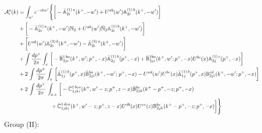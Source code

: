 \documentclass[aps,prd,amsmath,amssymb,nofootinbib]{revtex4-2}
\def\mf#1{\mathbb{#1}}
\numberwithin{equation}{section}
\begin{document}
\begin{align}
         {\cal A}^{a}_{i}(k) & = \int_{w^{\prime}}e^{-ikw^{\prime}} \Bigg\{\bigg[-\bar{\mf{A}}^{(1)\,a}_{2i}(k^{+},-w^{\prime})+U^{ab}(w^{\prime})\mf{A}^{(1)\, b}_{2i}(k^{+},
         - w^{\prime})\bigg]\notag \\ & +\bigg[-\bar{\mf{A}}^{(1)\,a}_{2i}(k^{+},-w^{\prime})\mf{N}_{2}+ U^{ab}(w^{\prime})\bar{\mf{N}}_{2}\mf{A}^{ (1)\, b}_{2i}(k^{+},-w^{\prime})\bigg]\notag 
         \\ & +\bigg[U^{ab}(w^{\prime})\mf{A}^{(3)\, b}_{2i}(k^{+},- w^{\prime})-\Bar{\mf{A}}^{(3)\, a}_{2i}(k^{+}, - w^{\prime})\bigg]\notag 
         \\ & 
         +\int \frac{dp^{+}}{2\pi}\int_{x}\,\bigg[-\Bar{\mf{B}}^{\dagger\, ba}_{3ji}(k^{+}, w^{\prime}; p^{+}, -x)\Bar{\mf{A}}^{(1)\,b}_{2j}(p^{+}, - x)
         + \Bar{\mf{B}}^{\dagger ba}_{3ji}(k^{+},w^{\prime}; p^{+},-x) U^{bc}(x) \mf{A}^{(1)\, c}_{2j}(p^{+},- x)\bigg]\notag
         \\ & 
         +2\,\int \frac{dp^{+}}{2\pi}\int_{x}\,\bigg[ \Bar{\mf{A}}^{(1)\, b}_{1j}(p^{+}, x)\Bar{\mf{B}}^{ba}_{2ji}(k^{+},-w^{\prime};\,p^{+}, -x) -U^{ad}(w^\prime)U^{bc}(x) \bar{\mf{A}}^{(1)\, b}_{1j}(p^+,x) {\mf{B}}^{cd}_{2ji} (k^+, -w^\prime;p^+, -x)\bigg]\notag 
         \\ & 
         +2\, \int \frac{dp^{+}}{2\pi}\,\int_{x,z}\, \bigg[-\Bar{\mf{C}}^{\dagger\, bca}_{1jki}(k^{+},w^{\prime}-z;p^{+},z-x)\Bar{\mf{B}}^{bc}_{2jk}(k^{+}-p^{+},- z;p^{+},-x)
         \notag \\ & \qquad \qquad \qquad  +\bar{\mf{C}}^{\dagger\, dca}_{1jki}(k^+,w^\prime-z; p^+, z-x)  
                 U^{db}(x)
                 U^{ce}(z) 
                {\mf{B}}^{be}_{2jk} (k^{+}-p^+, -z; p^+, -x) \bigg] \Bigg\}
    \end{align}   
Group (II): 
\end{document}
